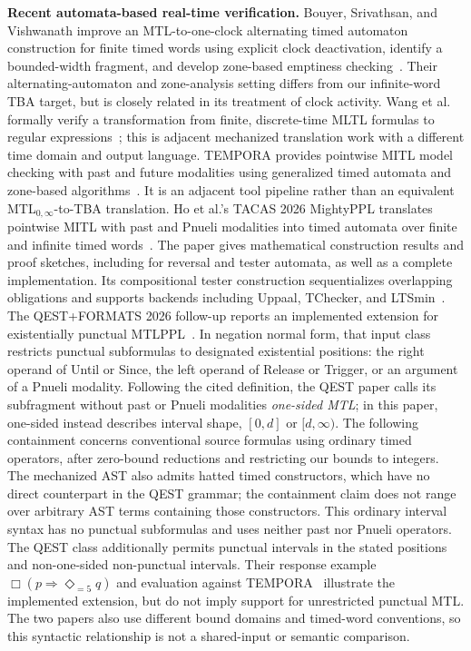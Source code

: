 \documentclass[10pt,journal,compsoc]{IEEEtran}
\newcommand{\runinhead}[1]{\par\smallskip\noindent\textbf{#1}\enspace}
\begin{document}
\runinhead{Recent automata-based real-time verification.}
Bouyer, Srivathsan, and Vishwanath improve an MTL-to-one-clock alternating
timed automaton construction for finite timed words using explicit clock
deactivation, identify a bounded-width fragment, and develop zone-based
emptiness checking~\cite{bouyer_srivathsan_vishwanath_fossacs25}. Their
alternating-automaton and zone-analysis setting differs from our infinite-word
TBA target, but is closely related in its treatment of clock activity. Wang et al.
formally verify a transformation from finite, discrete-time MLTL formulas to
regular expressions~\cite{wang_mltl_tacas25}; this is adjacent mechanized
translation work with a different time domain and output language. TEMPORA
provides pointwise MITL model checking with past and future modalities using
generalized timed automata and zone-based algorithms~\cite{akshay_et_al_tempora26}.
It is an adjacent tool pipeline rather than
an equivalent MTL$_{0,\infty}$-to-TBA translation.
Ho et al.'s TACAS 2026 MightyPPL translates pointwise MITL with past and
Pnueli modalities into timed automata over finite and infinite timed
words~\cite{mightyppl_tacas26}. The paper gives mathematical construction
results and proof sketches, including for reversal and tester automata, as
well as a complete implementation. Its compositional tester construction
sequentializes overlapping obligations and supports backends including
Uppaal, TChecker, and LTSmin~\cite{mightyppl_tacas26}. The QEST+FORMATS 2026
follow-up reports an implemented extension for existentially punctual
MTLPPL~\cite{mightyppl_qest26,mightyppl_qest_arxiv26}. In negation normal
form, that input class restricts punctual subformulas to designated
existential positions: the right operand of Until or Since, the left operand
of Release or Trigger, or an argument of a Pnueli modality. Following the
cited definition, the QEST paper calls its subfragment without past or Pnueli
modalities \emph{one-sided MTL}; in this paper, one-sided instead describes
interval shape, $[0,d]$ or $[d,\infty)$. The following containment concerns
conventional source formulas using ordinary timed operators, after zero-bound
reductions and restricting our bounds to integers. The mechanized AST also
admits hatted timed constructors, which have no direct counterpart in the QEST
grammar; the containment claim does not range over arbitrary AST terms
containing those constructors. This ordinary interval syntax has no punctual
subformulas and uses neither past nor Pnueli operators. The QEST class
additionally permits punctual intervals in the stated positions and
non-one-sided non-punctual intervals. Their response
example $\Box(p\Rightarrow\Diamond_{=5}q)$ and evaluation against
TEMPORA~\cite{mightyppl_qest26} illustrate the implemented extension, but do
not imply support for unrestricted punctual MTL. The two papers also use
different bound domains and timed-word conventions, so this syntactic
relationship is not a shared-input or semantic comparison.
\end{document}
